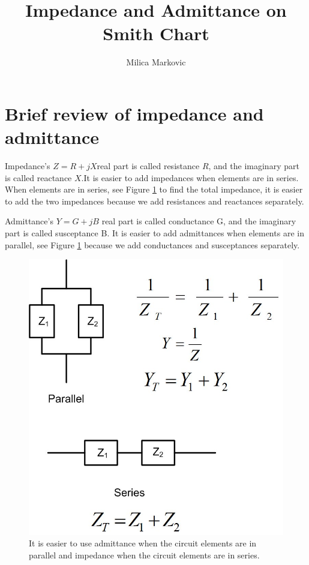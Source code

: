 \documentclass{ximera}
\title{Impedance and Admittance on Smith Chart}
\author{Milica Markovic}
\begin{document}
  
\begin{abstract}  

\end{abstract}  
\maketitle    




\section{Brief review of impedance and admittance}

Impedance's $Z =R+jX$real part is called resistance $R$, and the imaginary part is called reactance $X$.It is easier to add impedances when elements are in series.  When elements are in series, see Figure \ref{fig:SCDerimpadmtrans} to find the total impedance, it is easier to add the two impedances because we add resistances and reactances separately. 

 Admittance's $Y=G+jB$ real part is called conductance G, and the imaginary part is called susceptance B. It is easier to add admittances when elements are in parallel, see Figure \ref{fig:SCDerimpadmtrans} because we add conductances and susceptances separately.  
 
\begin{figure}[htbp]
\begin{center}
\includegraphics[scale=0.3]{../jpg/Impedance_Admittance.jpg}
\end{center}
\caption{It is easier to use admittance when the circuit elements are in parallel and impedance when the circuit elements are in series.}
\label{fig:SCDerimpadmtrans}
\end{figure}
\end{document}
